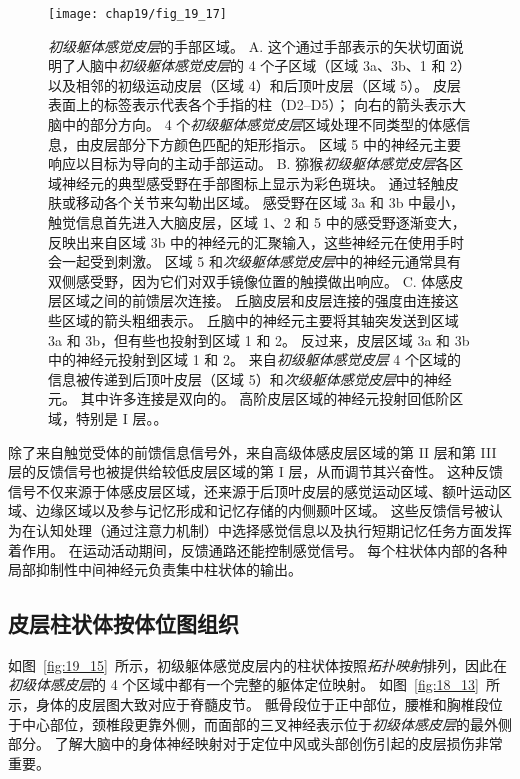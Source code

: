 \begin{figure}[htbp]
	\centering
	\texttt{[image: chap19/fig\_19\_17]}
	\caption{\textit{初级躯体感觉皮层}的手部区域。 
		A. 这个通过手部表示的矢状切面说明了人脑中\textit{初级躯体感觉皮层}的 4 个子区域（区域 3a、3b、1 和 2）以及相邻的初级运动皮层（区域 4）和后顶叶皮层（区域 5）。
		皮层表面上的标签表示代表各个手指的柱（D2–D5）；
		向右的箭头表示大脑中的部分方向。
		4 个\textit{初级躯体感觉皮层}区域处理不同类型的体感信息，由皮层部分下方颜色匹配的矩形指示。
		区域 5 中的神经元主要响应以目标为导向的主动手部运动。
		B. 猕猴\textit{初级躯体感觉皮层}各区域神经元的典型感受野在手部图标上显示为彩色斑块。
		通过轻触皮肤或移动各个关节来勾勒出区域。
		感受野在区域 3a 和 3b 中最小，触觉信息首先进入大脑皮层，区域 1、2 和 5 中的感受野逐渐变大，反映出来自区域 3b 中的神经元的汇聚输入，这些神经元在使用手时会一起受到刺激。
		区域 5 和\textit{次级躯体感觉皮层}中的神经元通常具有双侧感受野，因为它们对双手镜像位置的触摸做出响应\cite{gardner1988somatosensory,iwamura1993rostrocaudal,iwamura1994bilateral}。
		C. 体感皮层区域之间的前馈层次连接。
		丘脑皮层和皮层连接的强度由连接这些区域的箭头粗细表示。
		丘脑中的神经元主要将其轴突发送到区域 3a 和 3b，但有些也投射到区域 1 和 2。
		反过来，皮层区域 3a 和 3b 中的神经元投射到区域 1 和 2。
		来自\textit{初级躯体感觉皮层} 4 个区域的信息被传递到后顶叶皮层（区域 5）和\textit{次级躯体感觉皮层}中的神经元。
		其中许多连接是双向的。
		高阶皮层区域的神经元投射回低阶区域，特别是 I 层。\cite{felleman1991distributed}。}
	\label{fig:19_17}
\end{figure}


除了来自触觉受体的前馈信息信号外，来自高级体感皮层区域的第 II 层和第 III 层的反馈信号也被提供给较低皮层区域的第 I 层，从而调节其兴奋性。
这种反馈信号不仅来源于体感皮层区域，还来源于后顶叶皮层的感觉运动区域、额叶运动区域、边缘区域以及参与记忆形成和记忆存储的内侧颞叶区域。
这些反馈信号被认为在认知处理（通过注意力机制）中选择感觉信息以及执行短期记忆任务方面发挥着作用。
在运动活动期间，反馈通路还能控制感觉信号。
每个柱状体内部的各种局部抑制性中间神经元负责集中柱状体的输出。



\subsection{皮层柱状体按体位图组织}

如图~\ref{fig:19_15}~所示，初级躯体感觉皮层内的柱状体按照\textit{拓扑映射}排列，因此在\textit{初级体感皮层}的 4 个区域中都有一个完整的躯体定位映射。
如图~\ref{fig:18_13}~所示，身体的皮层图大致对应于脊髓皮节。
骶骨段位于正中部位，腰椎和胸椎段位于中心部位，颈椎段更靠外侧，而面部的三叉神经表示位于\textit{初级体感皮层}的最外侧部分。
了解大脑中的身体神经映射对于定位中风或头部创伤引起的皮层损伤非常重要。


